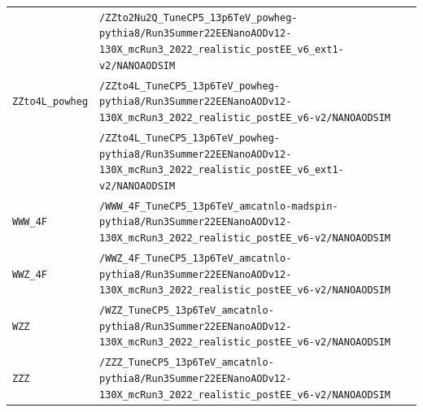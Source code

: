 \begin{longtable}{@{}>{\RaggedRight\arraybackslash}p{} >{\RaggedRight\arraybackslash}p{}@{}}
 & \texttt{/\allowbreak{}ZZto2Nu2Q\_\allowbreak{}TuneCP5\_\allowbreak{}13p6TeV\_\allowbreak{}powheg-\allowbreak{}pythia8/\allowbreak{}Run3Summer22EENanoAODv12-\allowbreak{}130X\_\allowbreak{}mcRun3\_\allowbreak{}2022\_\allowbreak{}realistic\_\allowbreak{}postEE\_\allowbreak{}v6\_\allowbreak{}ext1-\allowbreak{}v2/\allowbreak{}NANOAODSIM} \\
\addlinespace[2pt]
\texttt{ZZto4L\_\allowbreak{}powheg} & \texttt{/\allowbreak{}ZZto4L\_\allowbreak{}TuneCP5\_\allowbreak{}13p6TeV\_\allowbreak{}powheg-\allowbreak{}pythia8/\allowbreak{}Run3Summer22EENanoAODv12-\allowbreak{}130X\_\allowbreak{}mcRun3\_\allowbreak{}2022\_\allowbreak{}realistic\_\allowbreak{}postEE\_\allowbreak{}v6-\allowbreak{}v2/\allowbreak{}NANOAODSIM} \\
 & \texttt{/\allowbreak{}ZZto4L\_\allowbreak{}TuneCP5\_\allowbreak{}13p6TeV\_\allowbreak{}powheg-\allowbreak{}pythia8/\allowbreak{}Run3Summer22EENanoAODv12-\allowbreak{}130X\_\allowbreak{}mcRun3\_\allowbreak{}2022\_\allowbreak{}realistic\_\allowbreak{}postEE\_\allowbreak{}v6\_\allowbreak{}ext1-\allowbreak{}v2/\allowbreak{}NANOAODSIM} \\
\addlinespace[2pt]
\texttt{WWW\_\allowbreak{}4F} & \texttt{/\allowbreak{}WWW\_\allowbreak{}4F\_\allowbreak{}TuneCP5\_\allowbreak{}13p6TeV\_\allowbreak{}amcatnlo-\allowbreak{}madspin-\allowbreak{}pythia8/\allowbreak{}Run3Summer22EENanoAODv12-\allowbreak{}130X\_\allowbreak{}mcRun3\_\allowbreak{}2022\_\allowbreak{}realistic\_\allowbreak{}postEE\_\allowbreak{}v6-\allowbreak{}v2/\allowbreak{}NANOAODSIM} \\
\addlinespace[2pt]
\texttt{WWZ\_\allowbreak{}4F} & \texttt{/\allowbreak{}WWZ\_\allowbreak{}4F\_\allowbreak{}TuneCP5\_\allowbreak{}13p6TeV\_\allowbreak{}amcatnlo-\allowbreak{}pythia8/\allowbreak{}Run3Summer22EENanoAODv12-\allowbreak{}130X\_\allowbreak{}mcRun3\_\allowbreak{}2022\_\allowbreak{}realistic\_\allowbreak{}postEE\_\allowbreak{}v6-\allowbreak{}v2/\allowbreak{}NANOAODSIM} \\
\addlinespace[2pt]
\texttt{WZZ} & \texttt{/\allowbreak{}WZZ\_\allowbreak{}TuneCP5\_\allowbreak{}13p6TeV\_\allowbreak{}amcatnlo-\allowbreak{}pythia8/\allowbreak{}Run3Summer22EENanoAODv12-\allowbreak{}130X\_\allowbreak{}mcRun3\_\allowbreak{}2022\_\allowbreak{}realistic\_\allowbreak{}postEE\_\allowbreak{}v6-\allowbreak{}v2/\allowbreak{}NANOAODSIM} \\
\addlinespace[2pt]
\texttt{ZZZ} & \texttt{/\allowbreak{}ZZZ\_\allowbreak{}TuneCP5\_\allowbreak{}13p6TeV\_\allowbreak{}amcatnlo-\allowbreak{}pythia8/\allowbreak{}Run3Summer22EENanoAODv12-\allowbreak{}130X\_\allowbreak{}mcRun3\_\allowbreak{}2022\_\allowbreak{}realistic\_\allowbreak{}postEE\_\allowbreak{}v6-\allowbreak{}v2/\allowbreak{}NANOAODSIM} \\

\end{longtable}
